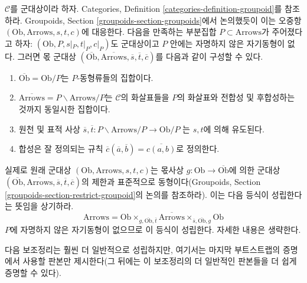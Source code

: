 \medskip\noindent
$\mathcal{C}$를 군대상이라 하자. Categories, Definition
\ref{categories-definition-groupoid}를 참조하라. Groupoids, Section
\ref{groupoids-section-groupoids}에서 논의했듯이 이는 오중항
$(\text{Ob}, \text{Arrows}, s, t, c)$에 대응한다. 다음을 만족하는 부분집합
$P \subset \text{Arrows}$가 주어졌다고 하자:
$(\text{Ob}, P, s|_P, t|_P, c|_P)$도 군대상이고 $P$ 안에는 자명하지 않은
자기동형이 없다. 그러면 몫 군대상
$(\overline{\text{Ob}}, \overline{\text{Arrows}}, \overline{s},
\overline{t}, \overline{c})$를 다음과 같이 구성할 수 있다.
\begin{enumerate}
\item $\overline{\text{Ob}} = \text{Ob}/P$는 $P$-동형류들의 집합이다.
\item $\overline{\text{Arrows}} = P\backslash \text{Arrows}/P$는
$\mathcal{C}$의 화살표들을 $P$의 화살표와 전합성 및 후합성하는 것까지
동일시한 집합이다.
\item 원천 및 표적 사상
$\overline{s}, \overline{t} : P\backslash \text{Arrows}/P \to \text{Ob}/P$
는 $s, t$에 의해 유도된다.
\item 합성은 잘 정의되는 규칙
$\overline{c}(\overline{a}, \overline{b}) = \overline{c(a, b)}$로 정의한다.
\end{enumerate}
실제로 원래 군대상 $(\text{Ob}, \text{Arrows}, s, t, c)$는 몫사상
$g : \text{Ob} \to \overline{\text{Ob}}$에 의한 군대상
$(\overline{\text{Ob}}, \overline{\text{Arrows}}, \overline{s},
\overline{t}, \overline{c})$의 제한과 표준적으로 동형이다(Groupoids,
Section \ref{groupoids-section-restrict-groupoid}의 논의를 참조하라).
이는 다음 등식이 성립한다는 뜻임을 상기하라.
$$
\text{Arrows} =
\text{Ob}
\times_{g, \overline{\text{Ob}}, \overline{t}}
\overline{\text{Arrows}}
\times_{\overline{s}, \overline{\text{Ob}}, g}
\text{Ob}
$$
$P$에 자명하지 않은 자기동형이 없으므로 이 등식이 성립한다. 자세한
내용은 생략한다.

\medskip\noindent
다음 보조정리는 훨씬 더 일반적으로 성립하지만, 여기서는 마지막
부트스트랩의 증명에서 사용할 판본만 제시한다(그 뒤에는 이 보조정리의
더 일반적인 판본들을 더 쉽게 증명할 수 있다).

